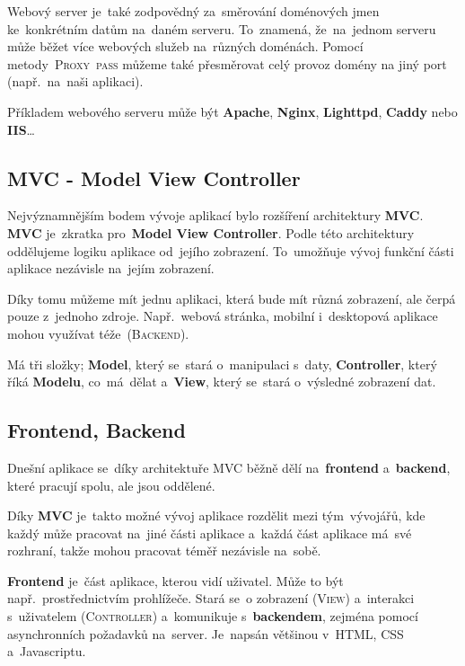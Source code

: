 \documentclass[14pt,a4paper]{article}
\begin{document}
        Webový server je~také zodpovědný za~směrování doménových jmen ke~konkrétním datům na~daném serveru. To~znamená, že~na~jednom serveru může běžet více webových služeb na~různých doménách.
        Pomocí metody~\textsc{Proxy~pass} můžeme také přesměrovat celý provoz domény na jiný port (např.~na~naši aplikaci). \parencite{webserver:mdn}

        Příkladem webového serveru může být \textbf{Apache}, \textbf{Nginx}, \textbf{Lighttpd}, \textbf{Caddy} nebo \textbf{IIS}\dots

        
        \subsection{MVC - Model View Controller}
        Nejvýznamnějším bodem vývoje aplikací bylo rozšíření architektury \textbf{MVC}. \textbf{MVC} je~zkratka pro~\textbf{Model View Controller}. Podle této architektury oddělujeme logiku aplikace od~jejího zobrazení. To~umožňuje vývoj funkční části aplikace nezávisle na~jejím zobrazení.

        Díky tomu můžeme mít jednu aplikaci, která bude mít různá zobrazení, ale čerpá pouze z~jednoho zdroje. Např.~webová stránka, mobilní i~desktopová aplikace mohou využívat téže~(\textsc{Backend}).

        Má tři složky; \textbf{Model}, který se~stará o~manipulaci s~daty, \textbf{Controller}, který říká \textbf{Modelu}, co~má~dělat a~\textbf{View}, který se~stará o~výsledné zobrazení dat. \parencite{MVC}

        \subsection{Frontend, Backend}
        Dnešní aplikace se~díky architektuře \textsc{MVC} běžně dělí na~\textbf{frontend} a~\textbf{backend}, které pracují spolu, ale jsou oddělené.

        Díky \textbf{MVC} je~takto možné vývoj aplikace rozdělit mezi tým~vývojářů, kde každý může pracovat na~jiné části aplikace a~každá část aplikace má~své rozhraní, takže mohou pracovat téměř nezávisle na~sobě.

        \textbf{Frontend} je~část aplikace, kterou vidí uživatel. Může to být např.~prostřednictvím prohlížeče. Stará se~o zobrazení (\textsc{View}) a~interakci s~uživatelem (\textsc{Controller}) a~komunikuje s~\textbf{backendem}, zejména pomocí asynchronních požadavků na~server. Je~napsán většinou v~HTML, CSS a~Javascriptu.
\end{document}
